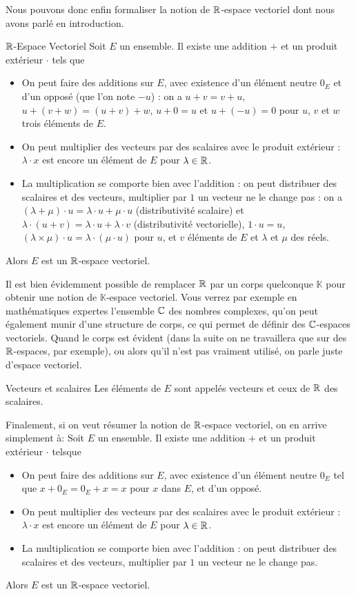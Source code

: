 \documentclass{classe}
\renewcommand*{\K}{\mathbb{K}}
\begin{document}
Nous pouvons donc enfin formaliser la notion de $\mathbb{R}$-espace vectoriel dont nous avons parlé en introduction.

\begin{définition}{$\mathbb{R}$-Espace Vectoriel}{}
	Soit $E$ un ensemble. Il existe une addition $+$ et un produit extérieur $\cdot$ tels que
	\begin{itemize}
		\item On peut faire des additions sur $E$, avec existence d'un élément neutre $0_E$ et d'un opposé (que l'on note $-u$) : on a $u+v = v+u$, $u+(v+w) = (u+v)+w$, $u+0=u$ et $u + (-u) = 0$ pour $u$, $v$ et $w$ trois éléments de $E$.
		\item On peut multiplier des vecteurs par des scalaires avec le produit extérieur : $\lambda\cdot x$ est encore un élément de $E$ pour $\lambda \in \mathbb{R}$.
		\item La multiplication se comporte bien avec l'addition : on peut distribuer des scalaires et des vecteurs, multiplier par $1$ un vecteur ne le change pas : on a $(\lambda + \mu)\cdot u = \lambda\cdot u + \mu\cdot u$ (distributivité scalaire) et $\lambda\cdot (u+v) = \lambda \cdot u+\lambda\cdot v$ (distributivité vectorielle), $1\cdot u = u$, $(\lambda\times\mu)\cdot u = \lambda\cdot (\mu\cdot u)$ pour $u$, et $v$ éléments de $E$ et $\lambda$ et $\mu$ des réels.
	\end{itemize}
	Alors $E$ est un $\mathbb{R}$-espace vectoriel.
\end{définition}

Il est bien évidemment possible de remplacer $\mathbb{R}$ par un corps quelconque $\K$ pour obtenir une notion de $\K$-espace vectoriel.
Vous verrez par exemple en mathématiques expertes l'ensemble $\mathbb{C}$ des nombres complexes, qu'on peut également munir d'une structure de corps, ce qui permet de définir des $\mathbb{C}$-espaces vectoriels.
Quand le corps est évident (dans la suite on ne travaillera que sur des $\mathbb{R}$-espaces, par exemple), ou alors qu'il n'est pas vraiment utilisé, on parle juste d'espace vectoriel.

\begin{définition}{Vecteurs et scalaires}{}
	Les éléments de $E$ sont appelés vecteurs et ceux de $\mathbb{R}$ des scalaires.
\end{définition}

Finalement, si on veut résumer la notion de $\mathbb{R}$-espace vectoriel, on en arrive simplement à:
Soit $E$ un ensemble. Il existe une addition $+$ et un produit extérieur $\cdot$ telsque
\begin{itemize}
		\item On peut faire des additions sur $E$, avec existence d'un élément neutre $0_E$ tel que $x + 0_E = 0_E + x = x$ pour $x$ dans $E$, et d'un opposé.
		\item On peut multiplier des vecteurs par des scalaires avec le produit extérieur : $\lambda\cdot x$ est encore un élément de $E$ pour $\lambda \in \mathbb{R}$.
		\item La multiplication se comporte bien avec l'addition : on peut distribuer des scalaires et des vecteurs, multiplier par $1$ un vecteur ne le change pas.
\end{itemize}
Alors $E$ est un $\mathbb{R}$-espace vectoriel.
\end{document}
